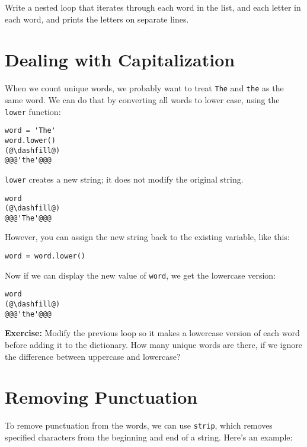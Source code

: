 Write a nested loop that iterates through each word in the list, and
each letter in each word, and prints the letters on separate lines.

\hypertarget{dealing-with-capitalization}{%
\section{Dealing with
Capitalization}\label{dealing-with-capitalization}}

When we count unique words, we probably want to treat
\passthrough{\lstinline!The!} and \passthrough{\lstinline!the!} as the
same word. We can do that by converting all words to lower case, using
the \passthrough{\lstinline!lower!} function:

\begin{lstlisting}[]
word = 'The'
word.lower()
(@\dashfill@)
@@@'the'@@@
\end{lstlisting}

\passthrough{\lstinline!lower!} creates a new string; it does not modify
the original string.

\begin{lstlisting}[]
word
(@\dashfill@)
@@@'The'@@@
\end{lstlisting}

However, you can assign the new string back to the existing variable,
like this:

\begin{lstlisting}[]
word = word.lower()
\end{lstlisting}

Now if we can display the new value of \passthrough{\lstinline!word!},
we get the lowercase version:

\begin{lstlisting}[]
word
(@\dashfill@)
@@@'the'@@@
\end{lstlisting}

\textbf{Exercise:} Modify the previous loop so it makes a lowercase
version of each word before adding it to the dictionary. How many unique
words are there, if we ignore the difference between uppercase and
lowercase?

\hypertarget{removing-punctuation}{%
\section{Removing Punctuation}\label{removing-punctuation}}

To remove punctuation from the words, we can use
\passthrough{\lstinline!strip!}, which removes specified characters from
the beginning and end of a string. Here's an example:

